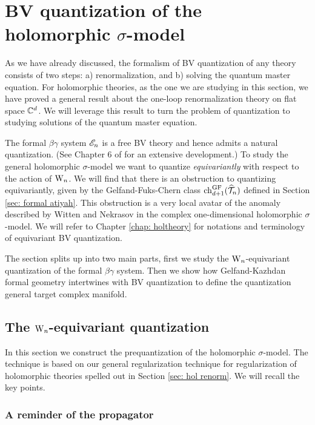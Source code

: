 \section{BV quantization of the holomorphic $\sigma$-model}

As we have already discussed, the formalism of BV quantization of any theory consists of two steps: a) renormalization, and b) solving the quantum master equation. 
For holomorphic theories, as the one we are studying in this section, we have proved a general result about the one-loop renormalization theory on flat space $\mathbb C^d$. 
We will leverage this result to turn the problem of quantization to studying solutions of the quantum master equation.

The formal $\beta\gamma$ system $\mathscr E_n$ is a free BV theory and hence admits a natural quantization.
(See Chapter 6 of \cite{GwThesis} for an extensive development.)  
To study the general holomorphic $\sigma$-model we want to quantize \emph{equivariantly} with respect to the action of ${{\rm W}_n}$.
We will find that there is an obstruction to quantizing equivariantly, 
given by the Gelfand-Fuks-Chern class ${\rm ch}_{d+1}^{{\rm GF}}(\widehat{\mathcal T}_n)$ defined in Section \ref{sec: formal atiyah}. 
This obstruction is a very local avatar of the anomaly described by Witten and Nekrasov \cite{WittenCDO,Nek} in the complex one-dimensional holomorphic $\sigma$-model.
We will refer to Chapter \ref{chap: holtheory} for notations and terminology of equivariant BV quantization.

The section splits up into two main parts, first we study the ${{\rm W}_n}$-equivariant quantization of the formal $\beta\gamma$ system.
Then we show how Gelfand-Kazhdan formal geometry intertwines with BV quantization to define the quantization general target complex manifold. 

\subsection{The ${{\rm W}_n}$-equivariant quantization}

In this section we construct the prequantization of the holomorphic $\sigma$-model.
The technique is based on our general regularization technique for regularization of holomorphic theories spelled out in Section \ref{sec: hol renorm}. 
We will recall the key points.

\subsubsection{A reminder of the propagator} \label{sec: remind prop}

